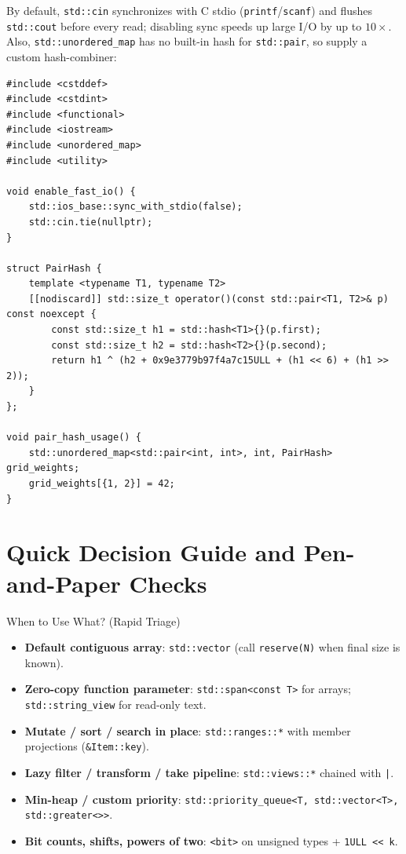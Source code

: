\documentclass[11pt,a4paper]{article}
\begin{document}
By default, \texttt{std::cin} synchronizes with C stdio (\texttt{printf}/\texttt{scanf}) and flushes \texttt{std::cout} before every read; disabling sync speeds up large I/O by up to $10\times$. Also, \texttt{std::unordered\_map} has no built-in hash for \texttt{std::pair}, so supply a custom hash-combiner:

\begin{lstlisting}[caption={Fast I/O boilerplate and custom \texttt{std::pair} hash for \texttt{std::unordered\_map}}]
#include <cstddef>
#include <cstdint>
#include <functional>
#include <iostream>
#include <unordered_map>
#include <utility>

void enable_fast_io() {
    std::ios_base::sync_with_stdio(false);
    std::cin.tie(nullptr);
}

struct PairHash {
    template <typename T1, typename T2>
    [[nodiscard]] std::size_t operator()(const std::pair<T1, T2>& p) const noexcept {
        const std::size_t h1 = std::hash<T1>{}(p.first);
        const std::size_t h2 = std::hash<T2>{}(p.second);
        return h1 ^ (h2 + 0x9e3779b97f4a7c15ULL + (h1 << 6) + (h1 >> 2));
    }
};

void pair_hash_usage() {
    std::unordered_map<std::pair<int, int>, int, PairHash> grid_weights;
    grid_weights[{1, 2}] = 42;
}
\end{lstlisting}

\section{Quick Decision Guide and Pen-and-Paper Checks}

\begin{calloutbox}{When to Use What? (Rapid Triage)}
\begin{itemize}[itemsep=2pt]
    \item \textbf{Default contiguous array}: \texttt{std::vector} (call \texttt{reserve(N)} when final size is known).
    \item \textbf{Zero-copy function parameter}: \texttt{std::span<const T>} for arrays; \texttt{std::string\_view} for read-only text.
    \item \textbf{Mutate / sort / search in place}: \texttt{std::ranges::*} with member projections (\texttt{\&Item::key}).
    \item \textbf{Lazy filter / transform / take pipeline}: \texttt{std::views::*} chained with \texttt{|}.
    \item \textbf{Min-heap / custom priority}: \texttt{std::priority\_queue<T, std::vector<T>, std::greater<>>}.
    \item \textbf{Bit counts, shifts, powers of two}: \texttt{<bit>} on unsigned types + \texttt{1ULL << k}.
\end{itemize}
\end{calloutbox}
\end{document}
